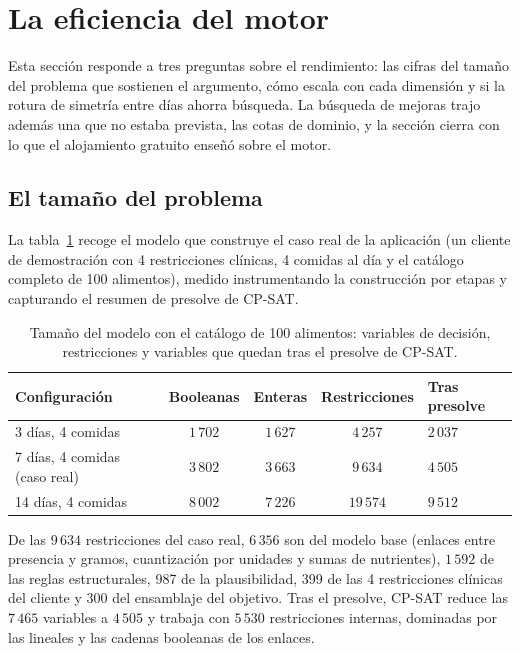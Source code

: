 \section{La eficiencia del motor}
\label{sec:evalEficiencia}

Esta sección responde a tres preguntas sobre el rendimiento: las cifras del tamaño del problema que sostienen el argumento, cómo escala con cada dimensión y si la rotura de simetría entre días ahorra búsqueda. La búsqueda de mejoras trajo además una que no estaba prevista, las cotas de dominio, y la sección cierra con lo que el alojamiento gratuito enseñó sobre el motor.

\subsection{El tamaño del problema}
\label{sec:evalTamano}

La tabla~\ref{tab:tamano} recoge el modelo que construye el caso real de la aplicación (un cliente de demostración con 4 restricciones clínicas, 4 comidas al día y el catálogo completo de 100 alimentos), medido instrumentando la construcción por etapas y capturando el resumen de presolve de CP-SAT.

\begin{table}[htbp]
\centering
\small
\begin{tabular}{|p{4.2cm}|c|c|c|p{2cm}|}
\hline
\textbf{Configuración} & \textbf{Booleanas} & \textbf{Enteras} & \textbf{Restricciones} & \textbf{Tras presolve} \\
\hline
3 días, 4 comidas & $1\,702$ & $1\,627$ & $4\,257$ & $2\,037$ \\
\hline
7 días, 4 comidas (caso real) & $3\,802$ & $3\,663$ & $9\,634$ & $4\,505$ \\
\hline
14 días, 4 comidas & $8\,002$ & $7\,226$ & $19\,574$ & $9\,512$ \\
\hline
\end{tabular}
\caption{Tamaño del modelo con el catálogo de 100 alimentos: variables de decisión, restricciones y variables que quedan tras el presolve de CP-SAT.}
\label{tab:tamano}
\end{table}

De las $9\,634$ restricciones del caso real, $6\,356$ son del modelo base (enlaces entre presencia y gramos, cuantización por unidades y sumas de nutrientes), $1\,592$ de las reglas estructurales, 987 de la plausibilidad, 399 de las 4 restricciones clínicas del cliente y 300 del ensamblaje del objetivo. Tras el presolve, CP-SAT reduce las $7\,465$ variables a $4\,505$ y trabaja con $5\,530$ restricciones internas, dominadas por las lineales y las cadenas booleanas de los enlaces.


